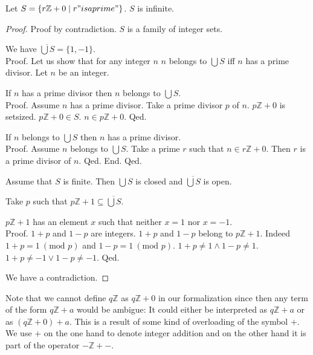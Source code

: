 \documentclass{article}
\renewcommand{\mod}{\text{mod }}
\newcommand{\Int}{\mathbb{Z}}
\begin{document}
  \begin{forthel}
    \begin{theorem}[Fuerstenberg]
      Let $S = \{ r \Int + 0 \mid r "is a prime" \}$. $S$ is infinite.
    \end{theorem}
    \begin{proof}
      Proof by contradiction. $S$ is a family of integer sets.

      We have $\overline{\bigcup S} = \{ 1, -1 \}$. \\
      Proof.
        Let us show that for any integer $n$ $n$ belongs to $\bigcup S$ iff $n$ has a prime divisor.
          Let $n$ be an integer.

          If $n$ has a prime divisor then $n$ belongs to $\bigcup S$. \\
          Proof.
            Assume $n$ has a prime divisor. Take a prime divisor $p$ of $n$. $p \Int + 0$ is setsized. $p \Int + 0 \in S$. $n \in p \Int + 0$.
          Qed.

          If $n$ belongs to $\bigcup S$ then $n$ has a prime divisor. \\
          Proof.
            Assume $n$ belongs to $\bigcup S$. Take a prime $r$ such that $n \in r \Int + 0$. Then $r$ is a prime divisor of $n$.
          Qed.
        End.
      Qed.

      Assume that $S$ is finite. Then $\bigcup S$ is closed and $\overline{\bigcup S}$ is open.

      Take $p$ such that $p \Int + 1 \subseteq \overline{\bigcup S}$.

      $p \Int + 1$ has an element $x$ such that neither $x = 1$ nor $x = -1$. \\
      Proof.
        $1 + p$ and $1 - p$ are integers. $1 + p$ and $1 - p$ belong to $p \Int + 1$. Indeed $1 + p = 1 ~(\mod p)$ and $1 - p = 1 ~(\mod p)$. $1 + p \neq  1 \wedge 1 - p \neq  1$. $1 + p \neq -1 \vee 1 - p \neq -1$.
      Qed.

      We have a contradiction.
    \end{proof}
  \end{forthel}

  Note that we cannot define $q \Int$ as $q \Int + 0$ in our formalization since then any term of the form $q \Int + a$ would be ambigue: It could either be interpreted as $q \Int + a$ or as $(q \Int + 0) + a$. This is a result of some kind of overloading of the symbol $+$. We use $+$ on the one hand to denote integer addition and on the other hand it is part of the operator $- \Int + -$.

  \vfill\doclicenseThis
\end{document}
